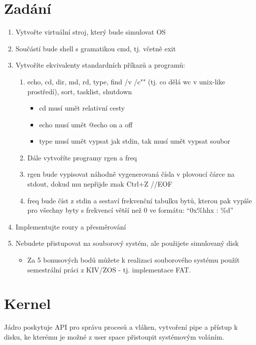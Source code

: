 \documentclass[11pt,a4paper]{scrartcl}
\begin{document}
	\section{Zadání}
	\begin{enumerate}
		\item 	Vytvořte virtuální stroj, který bude simulovat OS
		\item 	Součástí bude shell s gramatikou cmd, tj. včetně exit
		\item 	Vytvoříte ekvivalenty standardních příkazů a programů:
		\begin{enumerate}
			\item echo, cd, dir, md, rd, type, find /v /c"" (tj. co dělá wc v unix-like prostředí), sort, tasklist, shutdown
			
			\begin{itemize}
				\item	cd musí umět relativní cesty
				\item	echo musí umět @echo on a off
				\item	type musí umět vypsat jak stdin, tak musí umět vypsat soubor
			\end{itemize}
		
			\item	Dále vytvoříte programy rgen a freq
			\item	rgen bude vypisovat náhodně vygenerovaná čísla v plovoucí čárce na stdout, dokud mu nepřijde znak Ctrl+Z //EOF
			\item	freq bude číst z stdin a sestaví frekvenční tabulku bytů, kterou pak vypíše pro všechny byty s frekvencí větší než 0 ve formátu: “0x\%hhx : \%d”
		\end{enumerate}
		\item 	Implementujte roury a přesměrování
		\item 	Nebudete přistupovat na souborový systém, ale použijete simulovaný disk
		
		\begin{itemize}
			\item 	Za 5 bonusových bodů můžete k realizaci souborového systému použít semestrální práci z KIV/ZOS - tj. implementace FAT.
		\end{itemize}
	\end{enumerate}

	\section{Kernel}
	Jádro poskytuje API pro správu procesů a vláken, vytvoření pipe a přístup k disku, ke kterému je možné z user space přistoupit systémovým voláním.
	
\end{document}
